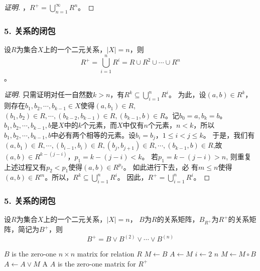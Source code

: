 \documentclass{beamer}
\begin{document}
\begin{CJK*}{UTF8}{gbsn}
\begin{frame}
\begin{proof}[证明]
{    ，\pause$ R^+ = \bigcup_{n=1}^\infty R^n$。}
  \end{proof}
\end{frame}
\begin{frame}
  \frametitle{5. 关系的闭包}
  \begin{Thm}
    设$R$为集合$X$上的一个二元关系，$|X| = n$，则\[R^+ = \bigcup_{i=1}^nR^i = R \cup R^2  \cup \cdots \cup R^n \]。
  \end{Thm}\pause
  \begin{proof}[证明]\justifying\let\raggedright\justifying\small{
      只需证明对任一自然数$k > n$，有$R^k \subseteq \bigcup_{i=1}^nR^i$。\pause
      为此，设$(a,b) \in R^k$，则存在$b_1, b_2, \cdots, b_{k-1} \in
      X$使得$(a,b_1) \in R$, $(b_1, b_2) \in R, \cdots, (b_{k-2}, b_{k-1})\in R,
      (b_{k-1}, b) \in R$。记$b_0 = a, b_k = b$。 \pause $b_1,b_2, \cdots,
      b_{k-1}, b$是$X$中的$k$个元素，而$X$中仅有$n$个元素，$n < k$，所以$b_1,
      b_2, \cdots, b_{k-1}, b$中必有两个相等的元素。设$b_i=b_j$，$1 \leq i < j
      \leq k$。 \pause 于是，我们有$(a,b_1)\in R, \cdots, (b_{i-1}, b_i)\in R,
      (b_j, b_{j+1})\in R, \cdots, (b_{k-1},b)\in R$,故$(a,b)\in
      R^{k-(j-i)}$，$p_1=k-(j-i) < k$。 \pause 若$p_1 = k - (j - i) > n$, 则重复
      上述过程又有$p_2 < p_1$使得$(a,b) \in R^{p_2}$。 \pause 如此进行下去，必
      有$m \leq n$使得$(a,b) \in R^m$。所以，$R^k \subseteq
      \bigcup_{i=1}^nR^i$。 \pause 因此，$R^+=\bigcup_{i=1}^nR^i$。}
  \end{proof}
\end{frame}
\begin{frame}
  \frametitle{5. 关系的闭包}
  \begin{Thm}
    设$R$为集合$X$上的一个二元关系，$|X| = n$， $B$为$R$的关系矩阵，$B_{R^+}$为$R^+$的关系矩阵，简记为$B^+$，则
    \begin{equation*}
      B^+ = B \lor B^{(2)} \lor \cdots \lor B^{(n)}
    \end{equation*}
  \end{Thm}
  \pause
  \begin{codebox}
    \zi \Comment $B$ is the zero-one $n \times n$ matrix for relation $R$
    \li $M \gets B$
    \li $A \gets M$
    \li \For $i \gets 2$ \To $n$
    \li \Do
        $M \gets M \circ B$
    \li $A \gets A \lor M$
    \End
    \li \Return A \Comment $A$ is the zero-one matrix for $R^+$
  \end{codebox}

\end{frame}




\end{CJK*}
\end{document}
